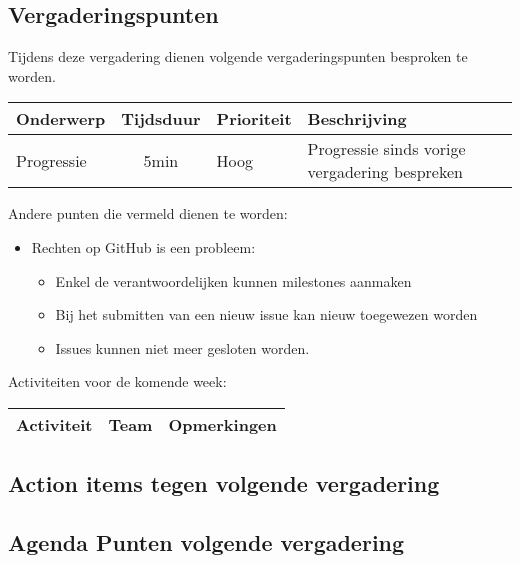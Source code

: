 \subsection{Vergaderingspunten}
Tijdens deze vergadering dienen volgende vergaderingspunten besproken te worden.
\begin{table} [H]
	\centering
	\begin{tabular} {l|cll}
		\textbf{Onderwerp} & \textbf{Tijdsduur} & \textbf{Prioriteit} & \textbf{Beschrijving} \\ %
		\hline
		Progressie & 5min & Hoog & Progressie sinds vorige vergadering bespreken \\

	\end{tabular}
\end{table}
Andere punten die vermeld dienen te worden:
\begin{itemize}
	\item
	{
		Rechten op GitHub is een probleem:
		\begin{itemize}
			\item Enkel de verantwoordelijken kunnen milestones aanmaken
			\item Bij het submitten van een nieuw issue kan nieuw toegewezen worden
			\item Issues kunnen niet meer gesloten worden.
		\end{itemize}	
	}
\end{itemize}
Activiteiten voor de komende week:
\begin{table} [H]
	\centering
	\begin{tabular} {l|ll}
		\textbf{Activiteit} & \textbf{Team} & \textbf{Opmerkingen} \\
		\hline

	\end{tabular}
\end{table}
\subsection{Action items tegen volgende vergadering}
\subsection{Agenda Punten volgende vergadering}

